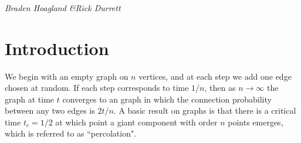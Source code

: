 \documentclass[twoside,10pt]{article}
\begin{document}

\thispagestyle{empty}
\begin{center}
	\MakeUppercase{
		{\large{} \\ }\\
		\vspace{10mm}
		{\footnotesize {}}\\
		\vspace{5mm}
	}
	{\footnotesize\textit{Braden Hoagland \quad\&\quad Rick Durrett}}
\end{center}


\begin{abstract}
	We develop the theory of cluster growth near criticality for a class of ``two-choice rules" for dynamically grown graphs. We use scaling theory to compute critical exponents for any two-choice rule, and we show special cases in which we can solve for these exponents explicitly. Finally, we compare our results with the corresponding results for the \ER rule, the simplest two-choice rule for which more explicit calculations are possible. We derive several of its important properties, then show that a large subset of two-choice rules - bounded size rules - behave like \ER near criticality.
\end{abstract}

\section{Introduction}

We begin with an empty graph on $n$ vertices, and at each step we add one edge chosen at random. If each step corresponds to time $1/n$, then as $n\to \infty$ the graph at time $t$ converges to an \ER graph in which the connection probability between any two edges is $2t/n$. A basic result on \ER graphs \cite{ER} is that there is a critical time $t_{c}=1/2$ at which point a giant component with order $n$ points emerges, which is referred to as ``percolation".
\end{document}
